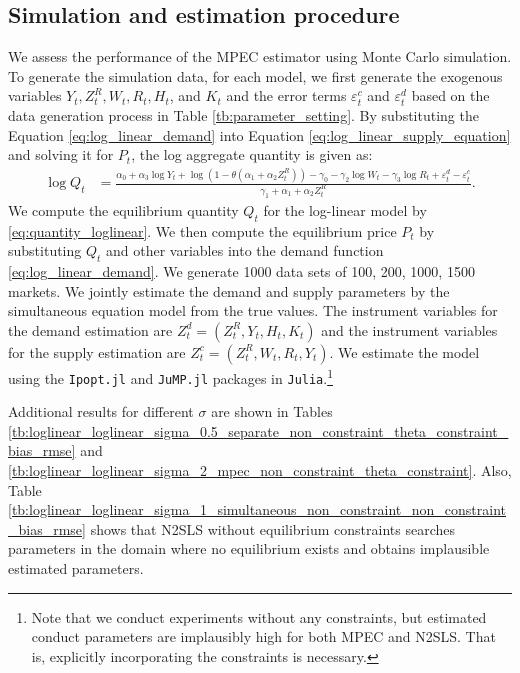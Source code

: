 \documentclass[11pt, a4paper]{article}
\begin{document}
\newpage
\subsection{Simulation and estimation procedure}
We assess the performance of the MPEC estimator using Monte Carlo simulation.
To generate the simulation data, for each model, we first generate the exogenous variables $Y_t, Z^{R}_{t}, W_t, R_{t}, H_t$, and $K_t$ and the error terms $\varepsilon_{t}^c$ and $\varepsilon_{t}^d$ based on the data generation process in Table \ref{tb:parameter_setting}.
By substituting the Equation \eqref{eq:log_linear_demand} into Equation \eqref{eq:log_linear_supply_equation} and solving it for $P_{t}$, the log aggregate quantity is given as: 
\begin{align}
    \log Q_t &= \frac{ \alpha_0 + \alpha_3 \log Y_t + \log (1 - \theta (\alpha_1 + \alpha_2 Z^{R}_{t})) - \gamma_0  -  \gamma_2 \log W_{t} - \gamma_3 \log R_t + \varepsilon^{d}_{t} - \varepsilon^{c}_{t}}{\gamma_1+ \alpha_1 + \alpha_2 Z^{R}_{t} }.\label{eq:quantity_loglinear}
\end{align}
We compute the equilibrium quantity $Q_{t}$ for the log-linear model by \eqref{eq:quantity_loglinear}.
We then compute the equilibrium price $P_t$ by substituting $Q_{t}$ and other variables into the demand function \eqref{eq:log_linear_demand}.
We generate 1000 data sets of 100, 200, 1000, 1500 markets.
We jointly estimate the demand and supply parameters by the simultaneous equation model \citep{wooldridge2010econometric} from the true values.
The instrument variables for the demand estimation are $Z^{d}_{t} = (Z^{R}_{t}, Y_t, H_{t}, K_{t})$ and the instrument variables for the supply estimation are $Z^{c}_{t} = (Z^{R}_{t}, W_{t}, R_{t}, Y_t)$. 
We estimate the model using the \texttt{Ipopt.jl} and \texttt{JuMP.jl} packages in \texttt{Julia}.\footnote{Note that we conduct experiments without any constraints, but estimated conduct parameters are implausibly high for both MPEC and N2SLS. That is, explicitly incorporating the constraints is necessary.}

Additional results for different $\sigma$ are shown in Tables \ref{tb:loglinear_loglinear_sigma_0.5_separate_non_constraint_theta_constraint_bias_rmse} and \ref{tb:loglinear_loglinear_sigma_2_mpec_non_constraint_theta_constraint}. 
Also, Table \ref{tb:loglinear_loglinear_sigma_1_simultaneous_non_constraint_non_constraint_bias_rmse} shows that N2SLS without equilibrium constraints searches parameters in the domain where no equilibrium exists and obtains implausible estimated parameters.
\end{document}
